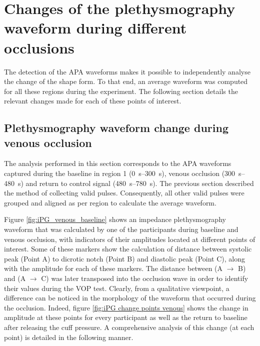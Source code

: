 \section{Changes of the plethysmography waveform during different occlusions}
\label{section apa 2}
The detection of the APA waveforms makes it possible to independently analyse the change of the shape form. To that end, an average waveform was computed for all these regions during the experiment. The following section details the relevant changes made for each of these points of interest. 

\subsection{Plethysmography waveform change during venous occlusion}
\label{section apa 2.1}
The analysis performed in this section corresponds to the APA waveforms captured during the baseline in region 1 (\SIrange{0}{300}{\second}), venous occlusion (\SIrange{300}{480}{\second}) and return to control signal (\SIrange{480}{780}{\second}).  The previous section described the method of collecting valid pulses. Consequently, all other valid pulses were grouped and aligned as per region to calculate the average waveform. 

Figure \ref{fig:iPG_venous_baseline} shows an impedance plethysmography waveform that was calculated by one of the participants during baseline and venous occlusion, with indicators of their amplitudes located at different points of interest. Some of these markers show the calculation of distance between systolic peak (Point A) to dicrotic notch (Point B) and diastolic peak (Point C), along with the amplitude for each of these markers. The distance between (A $\rightarrow$ B) and (A $\rightarrow$ C) was later transposed into the occlusion wave in order to identify their values during the VOP test. Clearly, from a qualitative viewpoint, a difference can be noticed in the morphology of the waveform that occurred during the occlusion.  Indeed, figure \ref{fig:iPG change points venous} shows the change in amplitude at these points for every participant as well as the return to baseline after releasing the cuff pressure. A comprehensive analysis of this change (at each point) is detailed in the following manner.

